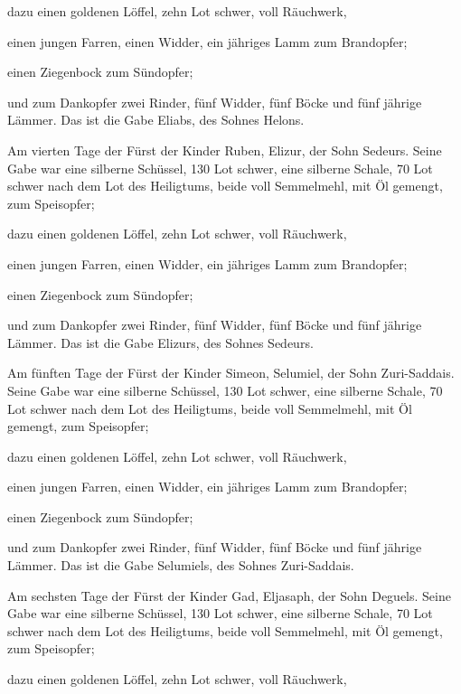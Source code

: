  dazu einen goldenen Löffel, zehn Lot schwer, voll
Räuchwerk,

 einen jungen Farren, einen Widder, ein jähriges Lamm zum
Brandopfer;

 einen Ziegenbock zum Sündopfer;

 und zum Dankopfer zwei Rinder, fünf Widder, fünf Böcke
und fünf jährige Lämmer. Das ist die Gabe Eliabs, des Sohnes Helons.

 Am vierten Tage der Fürst der Kinder Ruben, Elizur, der
Sohn Sedeurs.  Seine Gabe war eine silberne Schüssel, 130
Lot schwer, eine silberne Schale, 70 Lot schwer nach dem Lot des
Heiligtums, beide voll Semmelmehl, mit Öl gemengt, zum Speisopfer;

 dazu einen goldenen Löffel, zehn Lot schwer, voll
Räuchwerk,

 einen jungen Farren, einen Widder, ein jähriges Lamm zum
Brandopfer;

 einen Ziegenbock zum Sündopfer;

 und zum Dankopfer zwei Rinder, fünf Widder, fünf Böcke
und fünf jährige Lämmer. Das ist die Gabe Elizurs, des Sohnes Sedeurs.

 Am fünften Tage der Fürst der Kinder Simeon, Selumiel,
der Sohn Zuri-Saddais.  Seine Gabe war eine silberne
Schüssel, 130 Lot schwer, eine silberne Schale, 70 Lot schwer nach dem
Lot des Heiligtums, beide voll Semmelmehl, mit Öl gemengt, zum
Speisopfer;

 dazu einen goldenen Löffel, zehn Lot schwer, voll
Räuchwerk,

 einen jungen Farren, einen Widder, ein jähriges Lamm zum
Brandopfer;

 einen Ziegenbock zum Sündopfer;

 und zum Dankopfer zwei Rinder, fünf Widder, fünf Böcke
und fünf jährige Lämmer. Das ist die Gabe Selumiels, des Sohnes
Zuri-Saddais.

 Am sechsten Tage der Fürst der Kinder Gad, Eljasaph, der
Sohn Deguels.  Seine Gabe war eine silberne Schüssel, 130
Lot schwer, eine silberne Schale, 70 Lot schwer nach dem Lot des
Heiligtums, beide voll Semmelmehl, mit Öl gemengt, zum Speisopfer;

 dazu einen goldenen Löffel, zehn Lot schwer, voll
Räuchwerk,

